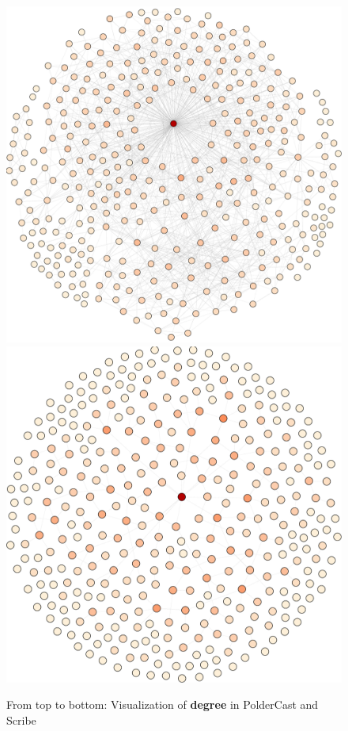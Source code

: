 \afterpage{\clearpage}
\begin{figure}
    \vspace{-100pt}
    \includegraphics[scale=0.5]{figures/polder_degree}
    \includegraphics[scale=0.5]{figures/scribe_degree}
    \caption{From top to bottom: Visualization of \textbf{degree} in
        PolderCast and Scribe}
    \label{fig:degree}
\end{figure}

